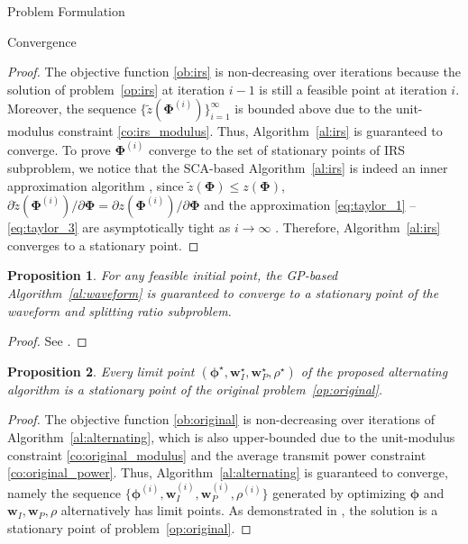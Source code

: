 \documentclass[journal]{IEEEtran}
\newtheorem{proposition}{Proposition}
\begin{document}
\begin{section}{Problem Formulation}
\begin{subsection}{Convergence}
			\begin{proof}\label{pf:irs}
				The objective function \ref{ob:irs} is non-decreasing over iterations because the solution of problem~\ref{op:irs} at iteration $i-1$ is still a feasible point at iteration $i$. Moreover, the sequence $\{\tilde{z}(\boldsymbol{\Phi}^{(i)})\}_{i=1}^{\infty}$ is bounded above due to the unit-modulus constraint \ref{co:irs_modulus}. Thus, Algorithm~\ref{al:irs} is guaranteed to converge. To prove $\boldsymbol{\Phi}^{(i)}$ converge to the set of stationary points of IRS subproblem, we notice that the SCA-based Algorithm~\ref{al:irs} is indeed an inner approximation algorithm \cite{Marks1978}, since $\tilde{z}(\boldsymbol{\Phi}) \le z(\boldsymbol{\Phi})$, $\partial\tilde{z}(\boldsymbol{\Phi}^{(i)})/\partial\boldsymbol{\Phi}=\partial z(\boldsymbol{\Phi}^{(i)})/\partial\boldsymbol{\Phi}$ and the approximation \ref{eq:taylor_1} -- \ref{eq:taylor_3} are asymptotically tight as $i \to \infty$ \cite{Adali2010,Li2013}. Therefore, Algorithm~\ref{al:irs} converges to a stationary point.
			\end{proof}

			\begin{proposition}\label{pr:waveform}
				For any feasible initial point, the GP-based Algorithm~\ref{al:waveform} is guaranteed to converge to a stationary point of the waveform and splitting ratio subproblem.
			\end{proposition}

			\begin{proof}\label{pf:waveform}
				See \cite{Clerckx2016a,Clerckx2018b}.
			\end{proof}

			\begin{proposition}\label{pr:ao}
				Every limit point $(\boldsymbol{\phi}^{\star},\boldsymbol{w}_I^{\star},\boldsymbol{w}_P^{\star},\rho^{\star})$ of the proposed alternating algorithm is a stationary point of the original problem~\ref{op:original}.
			\end{proposition}

			\begin{proof}\label{pf:ao}
				The objective function \ref{ob:original} is non-decreasing over iterations of Algorithm~\ref{al:alternating}, which is also upper-bounded due to the unit-modulus constraint \ref{co:original_modulus} and the average transmit power constraint \ref{co:original_power}. Thus, Algorithm~\ref{al:alternating} is guaranteed to converge, namely the sequence $\{\boldsymbol{\phi}^{(i)},\boldsymbol{w}_I^{(i)},\boldsymbol{w}_P^{(i)},\rho^{(i)}\}$ generated by optimizing $\boldsymbol{\phi}$ and $\boldsymbol{w}_I,\boldsymbol{w}_P,\rho$ alternatively has limit points. As demonstrated in \cite{Grippo2000,Hong2016,Li2013a}, the solution is a stationary point of problem~\ref{op:original}.
			\end{proof}
		\end{subsection}
	\end{section}
\end{document}

